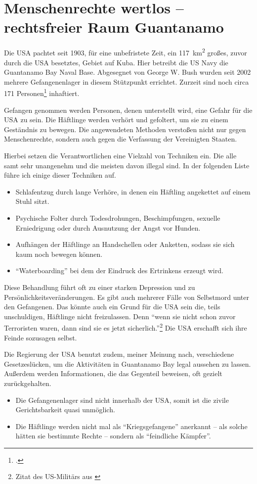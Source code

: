 \section{Menschenrechte wertlos -- rechtsfreier Raum Guantanamo}
Die USA pachtet seit 1903, für eine unbefristete Zeit, ein \SI{117}{\square\kilo\metre} großes,
zuvor durch die USA besetztes, Gebiet auf Kuba. Hier betreibt die US Navy die Guantanamo Bay Naval
Base. Abgesegnet von George W. Bush wurden seit 2002 mehrere Gefangenenlager in diesem Stützpunkt
errichtet. Zurzeit sind noch circa 171 Personen\footcite{Reuters:Obama} inhaftiert.

Gefangen genommen werden Personen, denen unterstellt wird, eine Gefahr für die USA zu sein. Die
Häftlinge werden verhört und gefoltert, um sie zu einem Geständnis zu bewegen. Die angewendeten
Methoden verstoßen nicht nur gegen Menschenrechte, sondern auch gegen die Verfassung der Vereinigten
Staaten.

Hierbei setzen die Verantwortlichen eine Vielzahl von Techniken ein.
Die alle samt sehr unangenehm und die meisten davon illegal sind.
In der folgenden Liste führe ich einige dieser Techniken auf.
\begin{itemize}
	\item Schlafentzug durch lange Verhöre, in denen ein Häftling angekettet auf einem Stuhl sitzt.
	\item Psychische Folter durch Todesdrohungen, Beschimpfungen, sexuelle Erniedrigung oder durch
		Ausnutzung der Angst vor Hunden.
	\item Aufhängen der Häftlinge an Handschellen oder Anketten, sodass sie sich kaum noch bewegen
		können.
	\item \enquote{Waterboarding} bei dem der Eindruck des Ertrinkens erzeugt wird.
\end{itemize}

Diese Behandlung führt oft zu einer starken Depression und zu Persönlichkeitsveränderungen.
Es gibt auch mehrerer Fälle von Selbstmord unter den Gefangenen.
Das könnte auch ein Grund für die USA sein die, teils unschuldigen, Häftlinge nicht freizulassen.
Denn \enquote{wenn sie nicht schon zuvor Terroristen waren, dann sind sie es jetzt
sicherlich.}\footnote{Zitat des US-Militärs aus \cite{Telepolis:Guantanamo}}
Die USA erschafft sich ihre Feinde sozusagen selbst.

Die Regierung der USA benutzt zudem, meiner Meinung nach, verschiedene Gesetzeslücken, um die
Aktivitäten in Guantanamo Bay legal aussehen zu lassen. Außerdem werden Informationen,
die das Gegenteil beweisen, oft gezielt zurückgehalten.
\begin{itemize}
	\item Die Gefangenenlager sind nicht innerhalb der USA, somit ist die zivile Gerichtsbarkeit
		quasi unmöglich.
	\item Die Häftlinge werden nicht mal als \enquote{Kriegsgefangene} anerkannt -- als solche
		hätten sie bestimmte Rechte -- sondern als \enquote{feindliche
		Kämpfer}. %
\end{itemize}

